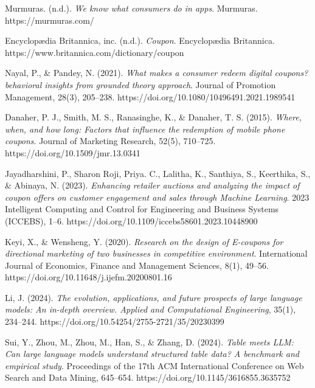 \documentclass[licencjacka,en]{pracamgr}
\begin{document}
\begin{thebibliography}{99}

\raggedright

Murmuras. (n.d.).  \textit{We know what consumers do in apps}. Murmuras. https://murmuras.com/ 

Encyclopædia Britannica, inc. (n.d.). \textit{Coupon}. Encyclopædia Britannica. https://www.britannica.com/dictionary/coupon 

Nayal, P., \& Pandey, N. (2021). \textit{What makes a consumer redeem digital coupons? behavioral insights from grounded theory approach}. Journal of Promotion Management, 28(3), 205–238. https://doi.org/10.1080/10496491.2021.1989541 

Danaher, P. J., Smith, M. S., Ranasinghe, K., \& Danaher, T. S. (2015). \textit{Where, when, and how long: Factors that influence the redemption of mobile phone coupons}. Journal of Marketing Research, 52(5), 710–725. https://doi.org/10.1509/jmr.13.0341 

Jayadharshini, P., Sharon Roji, Priya. C., Lalitha, K., Santhiya, S., Keerthika, S., \& Abinaya, N. (2023). \textit{Enhancing retailer auctions and analyzing the impact of coupon offers on customer engagement and sales through Machine Learning}. 2023 Intelligent Computing and Control for Engineering and Business Systems (ICCEBS), 1–6. https://doi.org/10.1109/iccebs58601.2023.10448900 

Keyi, X., \& Wensheng, Y. (2020). \textit{Research on the design of E-coupons for directional marketing of two businesses in competitive environment}. International Journal of Economics, Finance and Management Sciences, 8(1), 49–56. https://doi.org/10.11648/j.ijefm.20200801.16 

Li, J. (2024). \textit{The evolution, applications, and future prospects of large language models: An in-depth overview. Applied and Computational Engineering}, 35(1), 234–244. https://doi.org/10.54254/2755-2721/35/20230399 

Sui, Y., Zhou, M., Zhou, M., Han, S., \& Zhang, D. (2024). \textit{Table meets LLM: Can large language models understand structured table data? A benchmark and empirical study}. Proceedings of the 17th ACM International Conference on Web Search and Data Mining, 645–654. https://doi.org/10.1145/3616855.3635752 


\end{thebibliography}
\end{document}
